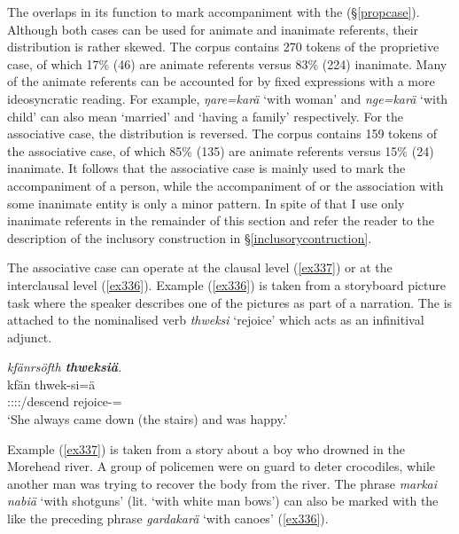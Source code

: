 The   overlaps in its function to mark accompaniment with the   ({\S}\ref{propcase}). Although both cases can be used for animate and inanimate referents, their distribution is rather skewed. The corpus contains 270 tokens of the proprietive case, of which 17\% (46) are animate referents versus 83\% (224) inanimate. Many of the animate referents can be accounted for by fixed expressions with a more ideosyncratic reading. For example, \emph{ŋare=karä} `with woman' and \emph{nge=karä} `with child' can also mean `married' and `having a family' respectively. For the associative case, the distribution is reversed. The corpus contains 159 tokens of the associative case, of which 85\% (135) are animate referents versus 15\% (24) inanimate. It follows that the associative case is mainly used to mark the accompaniment of a person, while the accompaniment of or the association with some inanimate entity is only a minor pattern. In spite of that I use only inanimate referents in the remainder of this section and refer the reader to the description of the inclusory construction in \S\ref{inclusorycontruction}. 

The associative case can operate at the clausal level (\ref{ex337}) or at the interclausal level (\ref{ex336}). Example (\ref{ex336}) is taken from a storyboard picture task where the speaker describes one of the pictures as part of a narration. The  is attached to the nominalised verb \emph{thweksi} `rejoice' which acts as an infinitival adjunct. 

  
\begin{exe}
	\ex \emph{kfänrsöfth \textbf{thweksiä}.}\\
	\gll kfän thwek-si=ä\\
	\Stsg:\Sbj:\Pst:\Iter:\Venit/descend rejoice-\Nmlz={\Assoc}\\
	\trans `She always came down (the stairs) and was happy.'
	\label{ex336}
\end{exe}

Example (\ref{ex337}) is taken from a story about a boy who drowned in the Morehead river. A group of policemen were on guard to deter crocodiles, while another man was trying to recover the body from the river. The phrase \emph{markai nabiä} `with shotguns' (lit. `with white man bows') can also be marked with the   like the preceding phrase \emph{gardakarä} `with canoes' (\ref{ex336}).

